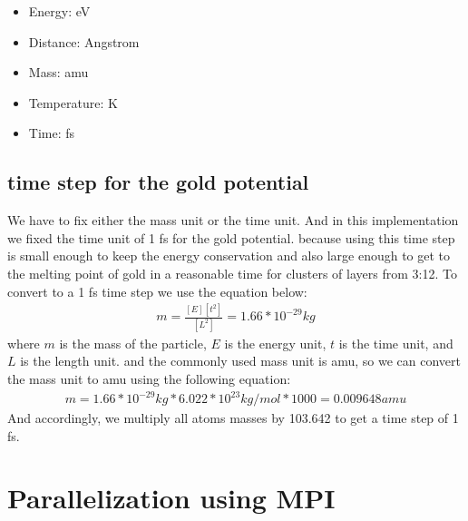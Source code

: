     \begin{itemize}
        \item Energy: eV
        \item Distance: Angstrom
        \item Mass: amu
        \item Temperature: K
        \item Time: fs
    \end{itemize}

    \subsection{time step for the gold potential}
    We have to fix either the mass unit or the time unit. And in this implementation we fixed the time unit of 1 fs for the gold potential. because using this time step is small enough to keep the energy conservation and also large enough to get to the melting point of gold in a reasonable time for clusters of layers from 3:12. To convert to a 1 fs time step we use the equation below: 
    \begin{equation}
    \label{eq:time_step}
        \begin{aligned}
            m = \frac{[E][t^2]}{[L^2]} = 1.66*10^{-29} kg
        \end{aligned}
    \end{equation}
    where $m$ is the mass of the particle, $E$ is the energy unit, $t$ is the time unit, and $L$ is the length unit.
    and the commonly used mass unit is amu, so we can convert the mass unit to amu using the following equation:
    \begin{equation}
    \label{eq:amu}
        \begin{aligned}
            m = 1.66*10^{-29} kg * 6.022*10^{23} kg/mol * 1000 = 0.009648 amu
        \end{aligned}
    \end{equation}
    And accordingly, we multiply all atoms masses by 103.642 to get a time step of 1 fs.


\section{Parallelization using MPI}